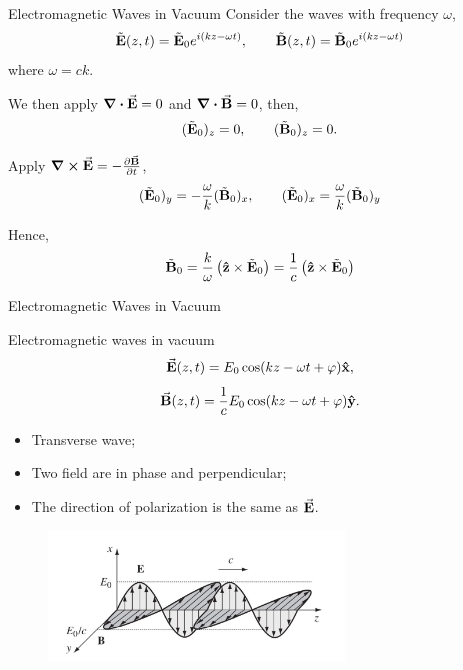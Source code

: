 \documentclass{beamer}
\begin{document}
\begin{frame}{Electromagnetic Waves in Vacuum}
    Consider the waves with frequency $\omega$,
    \begin{equation}
        \tilde{\vb{E}}(z, t) = \tilde{\vb{E}}_0 e^{i(kz - \omega t)}, \qquad \tilde{\vb{B}}(z, t) = \tilde{\vb{B}}_0 e^{i(kz - \omega t)}
    \end{equation}
    where $\omega = c k$.

    We then apply $\div \va{E} = 0$ and $\div \va{B} = 0$, then,
    \begin{equation}
        (\tilde{\vb{E}}_0)_z = 0, \qquad (\tilde{\vb{B}}_0)_z = 0.
    \end{equation}

    Apply $\curl \va{E} = -\pdv{\va{B}}{t}$,
    \begin{equation}
        (\tilde{\vb{E}}_0)_y = -\frac{\omega}{k} (\tilde{\vb{B}}_0)_x, \qquad (\tilde{\vb{E}}_0)_x = \frac{\omega}{k} (\tilde{\vb{B}}_0)_y
    \end{equation}

    Hence,
    \begin{equation}
        \tilde{\vb{B}}_0 = \frac{k}{\omega} \left(\vu{z} \times \tilde{\vb{E}}_0 \right) = \frac{1}{c} \left(\vu{z} \times \tilde{\vb{E}}_0 \right)
    \end{equation}
\end{frame}

\begin{frame}{Electromagnetic Waves in Vacuum}
    \begin{block}{Electromagnetic waves in vacuum}
        \begin{equation}
            \va{E}(z, t) = E_0 \cos(kz - \omega t + \varphi) \vu{x},
        \end{equation}
        \begin{equation}
            \va{B}(z, t) = \frac{1}{c}E_0 \cos(kz - \omega t + \varphi) \vu{y}.
        \end{equation}
    \end{block}
    \begin{itemize}
        \item Transverse wave;
        \item Two field are in phase and perpendicular;
        \item The direction of polarization is the same as $\va{E}$.
    \end{itemize}

    \begin{figure}[htbp]
        \centering
        \includegraphics[width=0.7\textwidth]{Images/emwave.jpg}
    \end{figure}
\end{frame}
\end{document}
